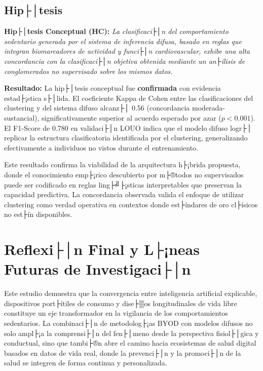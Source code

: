 \subsection{Hip├│tesis}
\label{subsec:cumplimiento_hipotesis}

\textbf{Hip├│tesis Conceptual (HC):} \textit{La clasificaci├│n del comportamiento sedentario generada por el sistema de inferencia difusa, basado en reglas que integran biomarcadores de actividad y funci├│n cardiovascular, exhibe una alta concordancia con la clasificaci├│n objetiva obtenida mediante un an├ílisis de conglomerados no supervisado sobre los mismos datos.}

\textbf{Resultado:} La hip├│tesis conceptual fue \textbf{confirmada} con evidencia estad├¡stica s├│lida. El coeficiente Kappa de Cohen entre las clasificaciones del clustering y del sistema difuso alcanz├│ 0.56 (concordancia moderada-sustancial), significativamente superior al acuerdo esperado por azar ($p < 0.001$). El F1-Score de 0.780 en validaci├│n LOUO indica que el modelo difuso logr├│ replicar la estructura clasificatoria identificada por el clustering, generalizando efectivamente a individuos no vistos durante el entrenamiento.

Este resultado confirma la viabilidad de la arquitectura h├¡brida propuesta, donde el conocimiento emp├¡rico descubierto por m├®todos no supervisados puede ser codificado en reglas ling├╝├¡sticas interpretables que preservan la capacidad predictiva. La concordancia observada valida el enfoque de utilizar clustering como verdad operativa en contextos donde est├índares de oro cl├ísicos no est├ín disponibles.


\section{Reflexi├│n Final y L├¡neas Futuras de Investigaci├│n}
\label{sec:reflexion_final}

Este estudio demuestra que la convergencia entre inteligencia artificial explicable, dispositivos port├ítiles de consumo y dise├▒os longitudinales de vida libre constituye un eje transformador en la vigilancia de los comportamientos sedentarios. La combinaci├│n de metodolog├¡as BYOD con modelos difusos no solo ampl├¡a la comprensi├│n del fen├│meno desde la perspectiva fisiol├│gica y conductual, sino que tambi├®n abre el camino hacia ecosistemas de salud digital basados en datos de vida real, donde la prevenci├│n y la promoci├│n de la salud se integren de forma continua y personalizada.

